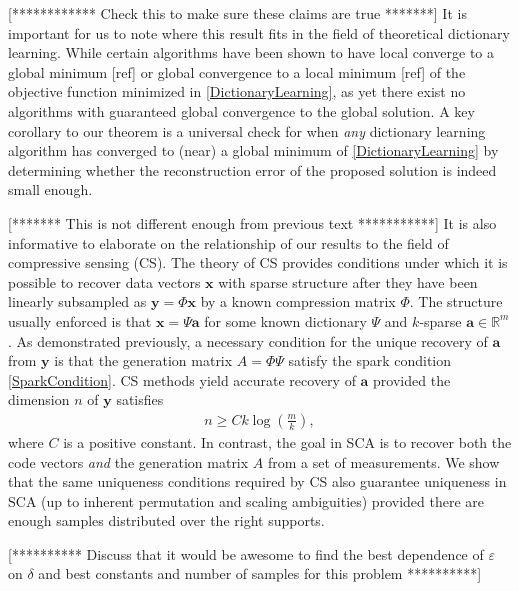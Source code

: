 \documentclass[journal, onecolumn]{IEEEtran}
\begin{document}
[************ Check this to make sure these claims are true *******]
It is important for us to note where this result fits in the field of theoretical dictionary learning. While certain algorithms have been shown to have local converge to a global minimum [ref] or global convergence to a local minimum [ref] of the objective function minimized in \eqref{DictionaryLearning}, as yet there exist no algorithms with guaranteed global convergence to the global solution. A key corollary to our theorem is a universal check for when \emph{any} dictionary learning algorithm has converged to (near) a global minimum of \eqref{DictionaryLearning} by determining whether the reconstruction error of the proposed solution is indeed small enough. 

[*******  This is not different enough from previous text ***********]
It is also informative to elaborate on the relationship of our results to the field of compressive sensing (CS). The theory of CS provides conditions under which it is possible to recover data vectors $\mathbf{x}$ with sparse structure after they have been linearly subsampled as $\mathbf{y} = \Phi \mathbf{x}$ by a known compression matrix $\Phi$. The structure usually enforced is that $\mathbf{x} = \Psi \mathbf{a}$ for some known dictionary $\Psi$ and $k$-sparse $\mathbf{a} \in \mathbb{R}^m$. As demonstrated previously, a necessary condition for the unique recovery of $\mathbf{a}$ from $\mathbf{y}$ is that the generation matrix $A = \Phi\Psi$ satisfy the spark condition \eqref{SparkCondition}. CS methods yield accurate recovery of $\mathbf{a}$ provided the dimension $n$ of $\mathbf{y}$ satisfies
\begin{align}\label{CScondition}
n \geq Ck\log\left(\frac{m}{k}\right),
\end{align}
%
where $C$ is a positive constant. In contrast, the goal in SCA is to recover both the code vectors \emph{and} the generation matrix $A$ from a set of measurements. We show that the same uniqueness conditions required by CS also guarantee uniqueness in SCA (up to inherent permutation and scaling ambiguities) provided there are enough samples distributed over the right supports.

[********** Discuss that it would be awesome to find the best dependence of $\varepsilon$ on $\delta$ and best constants and number of samples for this problem **********]
\end{document}
